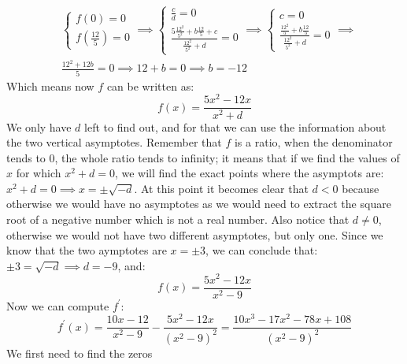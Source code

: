 \begin{equation*}
    \begin{split}
        &\begin{cases}
            f(0) = 0\\
            f\left( \frac{12}{5} \right) = 0
        \end{cases}
        \implies
        \begin{cases}
            \frac{c}{d} = 0\\
            \frac{5\frac{12^2}{5^2} + b\frac{12}{5} + c}{\frac{12^2}{5^2} + d} = 0
        \end{cases}
        \implies
        \begin{cases}
            c = 0\\
            \frac{\frac{12^2}{5} + b\frac{12}{5}}{\frac{12^2}{5^2} + d} = 0
        \end{cases}
        \implies\\
        &\frac{12^2 + 12b}{5} = 0 \implies
        12 + b = 0 \implies
        b = -12
    \end{split}
\end{equation*}
Which means now $f$ can be written as:
\begin{equation*}
    f(x) = \frac{5x^2 - 12x}{x^2 + d}
\end{equation*}
We only have $d$ left to find out, and for that we can use the information about
the two vertical asymptotes. Remember that $f$ is a ratio, when the denominator
tends to 0, the whole ratio tends to infinity; it means that if we find the
values of $x$ for which $x^2 + d = 0$, we will find the exact points where
the asymptots are: $x^2 + d = 0 \implies x = \pm \sqrt{-d}$. At this point
it becomes clear that $d < 0$ because otherwise we would have no asymptotes as
we would need to extract the square root of a negative number which is not a
real number.
Also notice that $d \neq 0$, otherwise we would not have two different
asymptotes, but only one. Since we know that the two aymptotes are $x = \pm 3$,
we can conclude that: $\pm 3 = \sqrt{-d} \implies d = -9$, and:
\begin{equation*}
    f(x) = \frac{5x^2 - 12x}{x^2 - 9}
\end{equation*}
Now we can compute $f^\prime$:
\begin{equation*}
    f^\prime(x) = \frac{10x - 12}{x^2 - 9} - \frac{5x^2 - 12x}{(x^2 - 9)^2} =
        \frac{10x^3 - 17x^2 - 78x + 108}{(x^2 - 9)^2}
\end{equation*}
We first need to find the zeros
